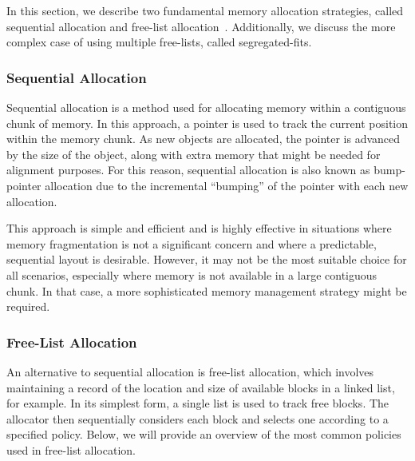 
In this section, we describe two fundamental memory allocation strategies, called sequential allocation and free-list allocation~\cite{gchandbook}. Additionally, we discuss the more complex case of using multiple free-lists, called segregated-fits.

\subsubsection{Sequential Allocation}
\label{sec:seq_allocation}
\label{sec:bump_pointer}

Sequential allocation is a method used for allocating memory within a contiguous chunk of memory. In this approach, a pointer is used to track the current position within the memory chunk. As new objects are allocated, the pointer is advanced by the size of the object, along with extra memory that might be needed for alignment purposes. For this reason, sequential allocation is also known as bump-pointer allocation due to the incremental ``bumping'' of the pointer with each new allocation.

This approach is simple and efficient and is highly effective in situations where memory fragmentation is not a significant concern and where a predictable, sequential layout is desirable. However, it may not be the most suitable choice for all scenarios, especially where memory is not available in a large contiguous chunk. In that case, a more sophisticated memory management strategy might be required.

\subsubsection{Free-List Allocation}
\label{sec:freelist_allocation}

An alternative to sequential allocation is free-list allocation, which involves maintaining a record of the location and size of available blocks in a linked list, for example. In its simplest form, a single list is used to track free blocks. The allocator then sequentially considers each block and selects one according to a specified policy. Below, we will provide an overview of the most common policies used in free-list allocation.

